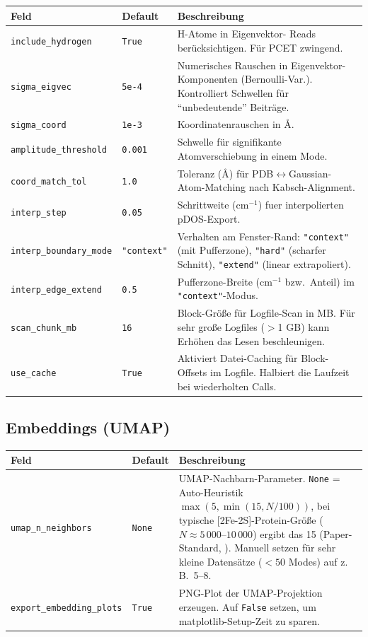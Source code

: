 \documentclass[11pt,a4paper,twoside]{article}
\theoremstyle{remark}
\begin{document}
\begin{longtable}{p{} p{} p{}}
\toprule
\textbf{Feld} & \textbf{Default} & \textbf{Beschreibung} \\
\midrule
\endhead
\texttt{include\_hydrogen} & \texttt{True} & H-Atome in Eigenvektor-
  Reads ber\"ucksichtigen. F\"ur PCET zwingend. \\
\texttt{sigma\_eigvec}    & \texttt{5e-4}  & Numerisches Rauschen
  in Eigenvektor-Komponenten (Bernoulli-Var.). Kontrolliert Schwellen
  f\"ur ``unbedeutende'' Beitr\"age. \\
\texttt{sigma\_coord}     & \texttt{1e-3} & Koordinatenrauschen
  in \AA{}. \\
\texttt{amplitude\_threshold} & \texttt{0.001} & Schwelle f\"ur
  signifikante Atomverschiebung in einem Mode. \\
\texttt{coord\_match\_tol} & \texttt{1.0}   & Toleranz (\AA{}) f\"ur
  PDB$\leftrightarrow$Gaussian-Atom-Matching nach Kabsch-Alignment. \\
\texttt{interp\_step}     & \texttt{0.05}  & Schrittweite (cm$^{-1}$)
  fuer interpolierten pDOS-Export. \\
\texttt{interp\_boundary\_mode} & \texttt{"context"} & Verhalten am
  Fenster-Rand: \texttt{"context"} (mit Pufferzone), \texttt{"hard"}
  (scharfer Schnitt), \texttt{"extend"} (linear extrapoliert). \\
\texttt{interp\_edge\_extend} & \texttt{0.5} & Pufferzone-Breite (cm$^{-1}$
  bzw.\ Anteil) im \texttt{"context"}-Modus. \\
\texttt{scan\_chunk\_mb}  & \texttt{16}    & Block-Gr\"o\ss e f\"ur
  Logfile-Scan in MB. F\"ur sehr gro\ss e Logfiles ($>$1 GB) kann
  Erh\"ohen das Lesen beschleunigen. \\
\texttt{use\_cache}       & \texttt{True}  & Aktiviert Datei-Caching f\"ur
  Block-Offsets im Logfile. Halbiert die Laufzeit bei wiederholten Calls. \\
\bottomrule
\end{longtable}

\subsection{Embeddings (UMAP)}

\begin{longtable}{p{} p{} p{}}
\toprule
\textbf{Feld} & \textbf{Default} & \textbf{Beschreibung} \\
\midrule
\endhead
\texttt{umap\_n\_neighbors} & \texttt{None} & UMAP-Nachbarn-Parameter.
  \texttt{None} = Auto-Heuristik $\max(5, \min(15, N/100))$, bei
  typische [2Fe-2S]-Protein-Gr\"o{\ss}e ($N \approx 5\,000$--$10\,000$) ergibt das 15 (Paper-Standard,
  \cite{McInnes2018}). Manuell setzen f\"ur sehr kleine
  Datens\"atze ($< 50$ Modes) auf z.\,B.\ 5--8. \\
\texttt{export\_embedding\_plots} & \texttt{True} & PNG-Plot der
  UMAP-Projektion erzeugen. Auf \texttt{False} setzen, um
  matplotlib-Setup-Zeit zu sparen. \\
\bottomrule
\end{longtable}
\end{document}
